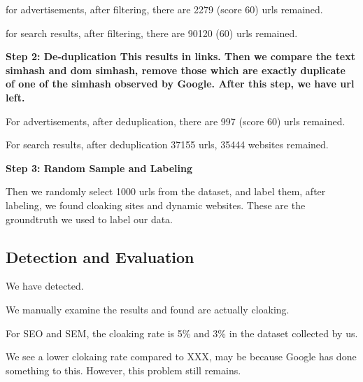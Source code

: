 for advertisements, after filtering, there are 2279 (score 60) urls
remained.

for search results, after filtering, there are 90120 (60) urls remained.


\bf{Step 2: De-duplication}
This results in  links. Then we compare the text simhash and dom
simhash, remove those which are exactly duplicate of one of the simhash observed
by Google. After this step, we have  url left.

For advertisements, after deduplication, there are 997 (score 60) urls remained.

For search results, after deduplication 37155 urls, 35444 websites remained.


\bf{Step 3: Random Sample and Labeling}


Then we randomly select 1000 urls from the dataset, and label them, after
labeling, we found  cloaking sites and  dynamic websites.
These are the groundtruth we used to label our data.

\subsection{Detection and Evaluation}
We have detected.

We manually examine the results and found  are actually cloaking.

For SEO and SEM, the cloaking rate is 5\% and 3\% in the dataset collected by
us.




We see a lower clokaing rate compared to XXX, may be because Google has done
something to this. However, this problem still remains.
